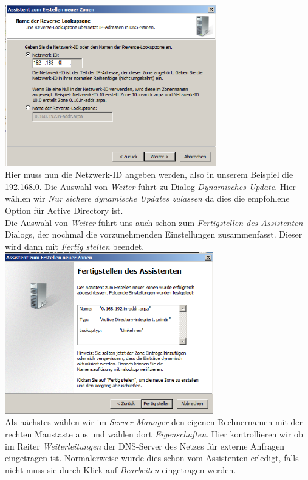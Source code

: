\documentclass[12pt,a4paper,titlepage]{scrartcl} %
\begin{document}
	\includegraphics[height=7cm]{Bilder/034(DNS06)}\\
	
Hier muss nun die Netzwerk-ID angeben werden, also in unserem Beispiel die 192.168.0. Die Auswahl von \emph{Weiter} führt zu Dialog \emph{Dynamisches Update}. Hier wählen wir \emph{Nur sichere dynamische Updates zulassen} da dies die empfohlene Option für Active Directory ist.\\
Die Auswahl von \emph{Weiter} führt uns auch schon zum \emph{Fertigstellen des Assistenten} Dialogs, der nochmal die vorzunehmenden Einstellungen zusammenfasst. Dieser wird dann mit \emph{Fertig stellen} beendet.\\

	\includegraphics[height=7cm]{Bilder/036(DNS08)}\\

Als nächstes wählen wir im \emph{Server Manager} den eigenen Rechnernamen mit der rechten Maustaste aus und wählen dort \emph{Eigenschaften}. Hier kontrollieren wir ob im Reiter \emph{Weiterleitungen} der DNS-Server des Netzes für externe Anfragen eingetragen ist. Normalerweise wurde dies schon vom Assistenten erledigt, falls nicht muss sie durch Klick auf \emph{Bearbeiten} eingetragen werden.\\
\end{document}
